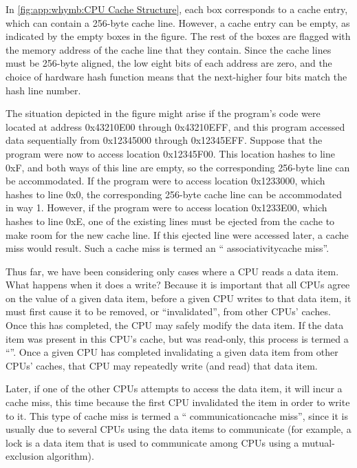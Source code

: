 In \cref{fig:app:whymb:CPU Cache Structure},
each box corresponds to a cache entry, which
can contain a 256-byte cache line.
However, a cache entry can be empty, as indicated by the empty boxes
in the figure.
The rest of the boxes are flagged with the memory address of the cache line
that they contain.
Since the cache lines must be 256-byte aligned, the low eight bits of
each address are
zero, and the choice of hardware hash function means that the next-higher
four bits match the hash line number.

The situation depicted in the figure might arise if the program's code
were located at address 0x43210E00 through 0x43210EFF, and this program
accessed data sequentially from 0x12345000 through 0x12345EFF\@.
Suppose that the program were now to access location 0x12345F00.
This location hashes to line 0xF, and both ways of this line are
empty, so the corresponding 256-byte line can be accommodated.
If the program were to access location 0x1233000, which hashes to line
0x0, the corresponding 256-byte cache line can be accommodated in
way 1.
However, if the program were to access location 0x1233E00, which hashes
to line 0xE, one of the existing lines must be ejected from the cache
to make room for the new cache line.
If this ejected line were accessed later, a cache miss would result.
Such a cache miss is termed an ``
{associativity}{cache miss}''.

Thus far, we have been considering only cases where a CPU reads
a data item.
What happens when it does a write?
Because it is important that all CPUs agree on the value of a given
data item, before a given CPU writes to that data item, it must first
cause it to be removed, or ``invalidated'', from other CPUs' caches.
Once this  has completed, the CPU may safely modify the
data item.
If the data item was present in this CPU's cache, but was read-only,
this process is termed a ``''.
Once a given CPU has completed invalidating a given data item from other
CPUs' caches, that CPU may repeatedly write (and read) that data item.

Later, if one of the other CPUs attempts to access the data item, it
will incur a cache miss, this time because the first CPU invalidated
the item in order to write to it.
This type of cache miss is termed a ``
{communication}{cache miss}'', since it
is usually due to several CPUs using the data items to communicate
(for example, a lock is a data item that is used to communicate among
CPUs using a mutual-exclusion algorithm).

